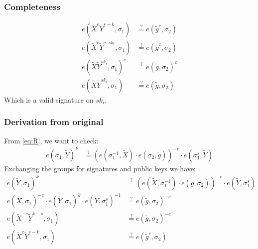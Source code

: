 \documentclass[11pt]{article}
\newenvironment{optimization}{\par\color{blue}}{\par}
\begin{document}
    \subsubsection{Completeness}
    \begin{optimization}
        \begin{align}
            e(\tilde{X}^c\tilde{Y}^{s-k}, \sigma_1)&\stackrel{?}{=}  e(\tilde{g}^c, \sigma_2)\\
            e(\tilde{X}^c\tilde{Y}^{c\cdot sk_i}, \sigma_1)&\stackrel{?}{=}  e(\tilde{g}^c, \sigma_2)\\
            e(\tilde{X}\tilde{Y}^{sk_i}, \sigma_1)^c &\stackrel{?}{=}  e(\tilde{g}, \sigma_2)^c\\
            e(\tilde{X}\tilde{Y}^{sk_i}, \sigma_1) &\stackrel{?}{=}  e(\tilde{g}, \sigma_2)
        \end{align}
        Which is a valid signature on $sk_i$.
    \end{optimization}

    \subsubsection{Derivation from original}
    \begin{optimization}
        From \ref{eq:R}, we want to check:
        \begin{align}
            e(\sigma_1, \tilde{Y})^{k} & \stackrel{?}{=}(e(\sigma_1^{-1}, \tilde{X})\cdot e(\sigma_2, \tilde{g}))^{-c}\cdot e(\sigma_1^s, \tilde{Y})
        \end{align}
        Exchanging the groups for signatures and public keys we have:
        \begin{align}
            e( \tilde{Y},\sigma_1)^{k} & \stackrel{?}{=}(e(\tilde{X},\sigma_1^{-1})\cdot e( \tilde{g},\sigma_2))^{-c}\cdot e( \tilde{Y},\sigma_1^s)\\
            e(\tilde{X},\sigma_1)^{-c}\cdot e( \tilde{Y},\sigma_1)^{k} \cdot e( \tilde{Y},\sigma_1^s)^{-1} & \stackrel{?}{=} e( \tilde{g},\sigma_2)^{-c}\\
            e(\tilde{X}^{-c}\tilde{Y}^{k-s},\sigma_1) & \stackrel{?}{=} e( \tilde{g},\sigma_2)^{-c}\\
            e(\tilde{X}^{c}\tilde{Y}^{s-k},\sigma_1) & \stackrel{?}{=} e( \tilde{g}^{c},\sigma_2)
        \end{align}
    \end{optimization}
\end{document}
